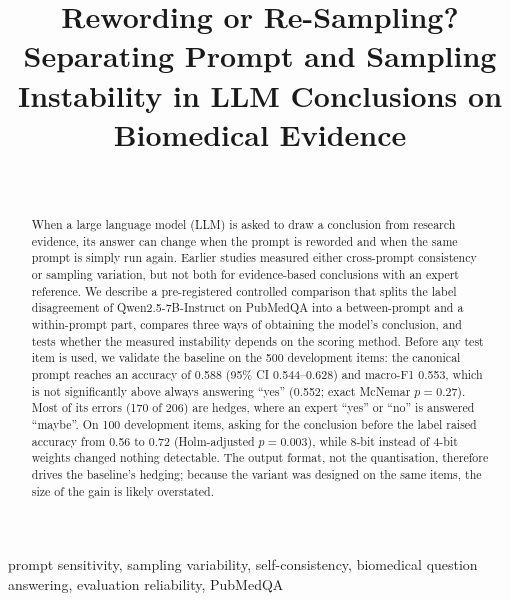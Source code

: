 \documentclass[conference]{IEEEtran}
\begin{document}
\title{Rewording or Re-Sampling? Separating Prompt and Sampling
Instability in LLM Conclusions on Biomedical Evidence}

\author{
\\
}

\maketitle

\begin{abstract}
When a large language model (LLM) is asked to draw a conclusion from
research evidence, its answer can change when the prompt is reworded and
when the same prompt is simply run again. Earlier studies measured either
cross-prompt consistency or sampling variation, but not both for
evidence-based conclusions with an expert reference. We describe a
pre-registered controlled comparison that splits the label disagreement of
Qwen2.5-7B-Instruct on PubMedQA into a between-prompt and a within-prompt
part, compares three ways of obtaining the model's conclusion, and tests
whether the measured instability depends on the scoring method. Before any
test item is used, we validate the baseline on the 500 development items:
the canonical prompt reaches an accuracy of 0.588 (95\% CI 0.544--0.628)
and macro-F1 0.553, which is not significantly above always answering
``yes'' (0.552; exact McNemar $p = 0.27$). Most of its errors (170 of 206)
are hedges, where an expert ``yes'' or ``no'' is answered ``maybe''. On 100
development items, asking for the conclusion before the label raised
accuracy from 0.56 to 0.72 (Holm-adjusted $p = 0.003$), while 8-bit instead
of 4-bit weights changed nothing detectable. The output format, not the
quantisation, therefore drives the baseline's hedging; because the variant
was designed on the same items, the size of the gain is likely
overstated.
\end{abstract}

\begin{IEEEkeywords}
prompt sensitivity, sampling variability, self-consistency, biomedical
question answering, evaluation reliability, PubMedQA
\end{IEEEkeywords}

\end{document}
